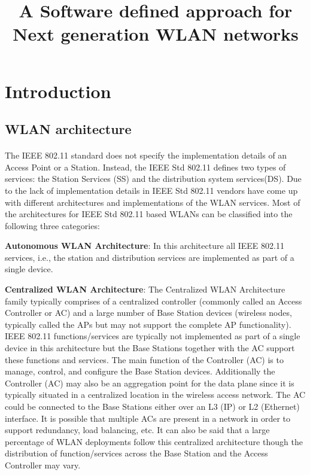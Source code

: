 \documentclass[12pt]{article}
\begin{document}
\title{A Software defined approach for Next generation WLAN networks}

	
\section{Introduction}
\subsection{WLAN architecture}
\paragraph{}
The IEEE 802.11 standard does not specify the implementation details of an Access Point or a Station. Instead, the IEEE Std 802.11 defines two types of services: the Station Services (SS) and the distribution system services(DS). Due to the lack of implementation details in IEEE Std 802.11 vendors have come up with different architectures and implementations of the WLAN services. Most of the architectures for IEEE Std 802.11 based WLANs can be classified into the following three categories: 

 

    \textbf{Autonomous WLAN Architecture}: In this architecture all IEEE 802.11 services, i.e., the station and distribution services are implemented as part of a single device.  

    \textbf{Centralized WLAN Architecture}: The Centralized WLAN Architecture family typically comprises of a centralized controller (commonly called an Access Controller or AC) and a large number of Base Station devices (wireless nodes, typically called the APs but may not support the complete AP functionality). IEEE 802.11 functions/services are typically not implemented as part of a single device in this architecture but the Base Stations together with the AC support these functions and services. The main function of the Controller (AC) is to manage, control, and configure the Base Station devices. Additionally the Controller (AC) may also be an aggregation point for the data plane since it is typically situated in a centralized location in the wireless access network. The AC could be connected to the Base Stations either over an L3 (IP) or L2 (Ethernet) interface. It is possible that multiple ACs are present in a network in order to support redundancy, load balancing, etc. It can also be said that a large percentage of WLAN deployments follow this centralized architecture though the distribution of function/services across the Base Station and the Access Controller may vary. 
\end{document}
